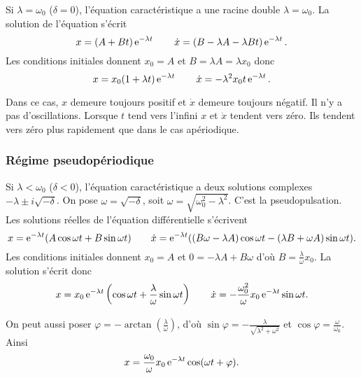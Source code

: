 Si $\lambda = \omega_0$ ($\delta=0$), l'équation caractéristique a une racine double $\lambda=\omega_0$. La solution de l'équation s'écrit
\begin{equation}
  x = (A+Bt)\operatorname{e}^{-\lambda t} \qquad \dot x = (B-\lambda A-\lambda B t)\operatorname{e}^{-\lambda t}.
\end{equation}
Les conditions initiales donnent $x_0=A$ et $B=\lambda A=\lambda x_0$ donc
\begin{equation}
  x = x_0(1+\lambda t)\operatorname{e}^{-\lambda t} \qquad \dot x = -\lambda^2 x_0 t \operatorname{e}^{-\lambda t}.
\end{equation}

Dans ce cas, $x$ demeure toujours positif et $\dot x$ demeure toujours négatif. Il n'y a pas d'oscillations. Lorsque $t$ tend vers l'infini $x$ et $\dot x$ tendent vers zéro. Ils tendent vers zéro plus rapidement que dans le cas apériodique.


\subsubsection{Régime pseudopériodique}
\label{chap5-subsubsec:pseudoperiodique}

Si $\lambda < \omega_0$ ($\delta < 0$), l'équation caractéristique a deux solutions complexes $-\lambda \pm i\sqrt{-\delta}$. On pose $\omega = \sqrt{-\delta}$, soit $\omega = \sqrt{\omega_0^2-\lambda^2}$. C'est la pseudopulsation. Les solutions réelles de l'équation différentielle s'écrivent
\begin{equation}
  x = \operatorname{e}^{-\lambda t}(A\cos\omega t + B\sin\omega t) \qquad \dot x = \operatorname{e}^{-\lambda t}((B\omega -\lambda A)\cos\omega t - (\lambda B + \omega A)\sin\omega t).
\end{equation}
Les conditions initiales donnent $x_0=A$ et $0 = -\lambda A + B \omega$ d'où $B = \frac{\lambda}{\omega}x_0$. La solution s'écrit donc
\begin{equation}
  x = x_0 \operatorname{e}^{-\lambda t}\left(\cos \omega t + \frac{\lambda}{\omega}\sin\omega t\right) \qquad \dot x = -\frac{\omega_0^2}{\omega}x_0 \operatorname{e}^{-\lambda t}\sin \omega t.
\end{equation}

On peut aussi poser $\varphi = -\arctan\left(\frac{\lambda}{\omega}\right)$, d'où $\sin\varphi = -\frac{\lambda}{\sqrt{\lambda^2+\omega^2}}$ et $\cos\varphi = \frac{\omega}{\omega_0}$. Ainsi
\begin{equation}
  x = \frac{\omega_0}{\omega}x_0 \operatorname{e}^{-\lambda t} \cos(\omega t + \varphi).
\end{equation}

